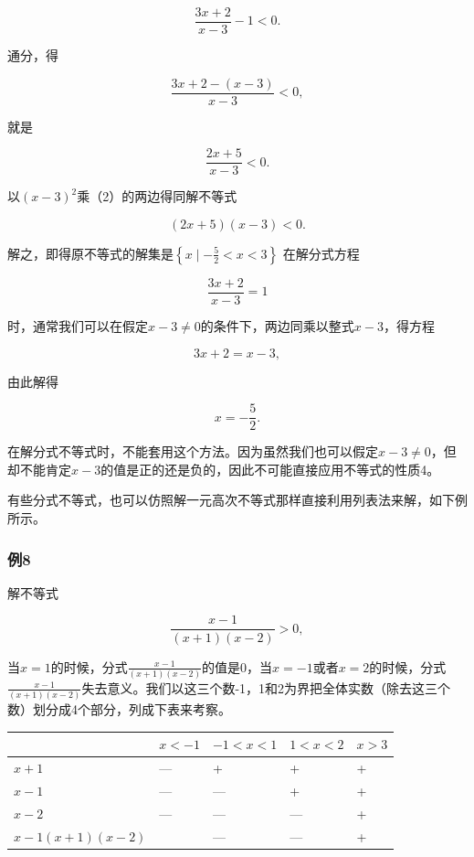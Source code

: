 \[
\frac{3 x + 2}{x - 3} - 1 < 0.
\]

通分，得

\[
\frac{3 x + 2 - (x - 3)}{x - 3} < 0,
\]

就是

\[
\frac{2 x + 5}{x - 3} < 0. \tag {2}
\]

以\((x - 3)^{2}\)乘（2）的两边得同解不等式

\[
(2 x + 5) (x - 3) < 0. \tag {3}
\]

解之，即得原不等式的解集是\(\left\{x\mid -\frac{5}{2} < x < 3\right\}\)
 在解分式方程

\[
\frac{3x+2}{x-3} = 1
\]

时，通常我们可以在假定\(x - 3 \neq 0\)的条件下，两边同乘以整式\(x - 3\)，得方程

\[
3 x + 2 = x - 3,
\]

由此解得

\[
x = - \frac{5}{2}.
\]

在解分式不等式时，不能套用这个方法。因为虽然我们也可以假定\(x - 3 \neq 0\)，但却不能肯定\(x - 3\)的值是正的还是负的，因此不可能直接应用不等式的性质4。

有些分式不等式，也可以仿照解一元高次不等式那样直接利用列表法来解，如下例所示。

\subsubsection{例8}

解不等式

\[
\frac{x-1}{(x+1)(x-2)} > 0,
\]

当\(x = 1\)的时候，分式\(\frac{x - 1}{(x + 1)(x - 2)}\)的值是0，当\(x = -1\)或者\(x = 2\)的时候，分式\(\frac{x - 1}{(x + 1)(x - 2)}\)失去意义。我们以这三个数-1，1和2为界把全体实数（除去这三个数）划分成4个部分，列成下表来考察。

{\def\LTcaptype{none} %
\begin{longtable}[]{@{}lllll@{}}
\toprule\noalign{}
& \(x < -1\) & \(-1 < x < 1\) & \(1 < x < 2\) & \(x > 3\) \\
\midrule\noalign{}
\endhead
\bottomrule\noalign{}
\endlastfoot
\(x + 1\) & --- & + & + & + \\
\(x - 1\) & --- & --- & + & + \\
\(x - 2\) & --- & --- & --- & + \\
\(x - 1\)\((x + 1)(x - 2)\) & & --- & --- & + \\
\end{longtable}
}

